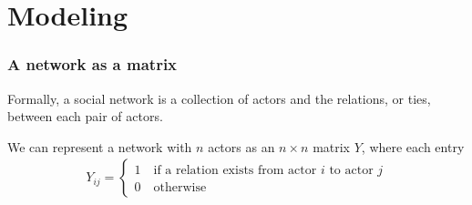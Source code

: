 \documentclass[slidestop,compress, 10pt]{beamer}
\begin{document}
\section{Modeling}
\frame
{
\frametitle{A network as a matrix}
Formally, a social network is a collection of actors and the relations, or ties, between each 
pair of actors.  

We can represent a network with $n$ actors as an $n \times n$ matrix $Y$, where each entry
\begin{align*}
	Y_{ij} =
	\begin{cases} 	1 \quad \text{if a relation exists from actor $i$ to actor $j$}\\
					0 \quad \text{otherwise}
	\end{cases}
\end{align*}

}
\end{document}
